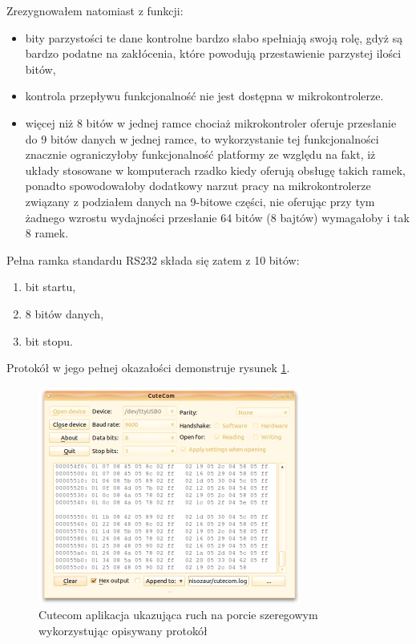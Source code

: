Zrezygnowałem natomiast z funkcji:
\begin{itemize}
 \item bity parzystości \ppauza te dane kontrolne bardzo słabo spełniają swoją rolę, gdyż są bardzo podatne na zakłócenia, które powodują przestawienie parzystej ilości bitów,
 \item kontrola przepływu \ppauza funkcjonalność nie jest dostępna w mikrokontrolerze.
 \item więcej niż 8 bitów w jednej ramce \ppauza chociaż mikrokontroler oferuje przesłanie do 9 bitów danych w jednej ramce, to wykorzystanie tej funkcjonalności znacznie ograniczyłoby funkcjonalność platformy ze względu na fakt, iż układy stosowane w komputerach rzadko kiedy oferują obsługę takich ramek, ponadto spowodowałoby dodatkowy narzut pracy na mikrokontrolerze związany z podziałem danych na 9-bitowe części, nie oferując przy tym żadnego wzrostu wydajności \ppauza przesłanie 64 bitów (8 bajtów) wymagałoby i tak 8 ramek.
\end{itemize}

Pełna ramka standardu RS232 składa się zatem z 10 bitów:
\begin{enumerate}
 \item bit startu,
 \item 8 bitów danych,
 \item bit stopu.
\end{enumerate}

Protokół w jego pełnej okazałości demonstruje rysunek \ref{fig:cutecom}.

\begin{figure}
  \includegraphics[width=327px]{gfx/cutecom.png}
  \caption{Cutecom \ppauza aplikacja ukazująca ruch na porcie szeregowym wykorzystując opisywany protokół}
  \label{fig:cutecom}
\end{figure}
